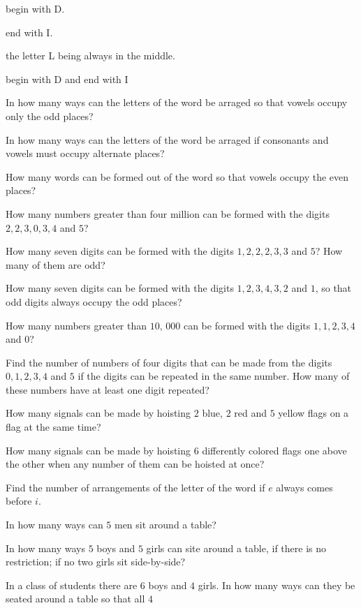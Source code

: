   \startitemize[i]
  \item begin with D.
  \item end with I.
  \item the letter L being always in the middle.
  \item begin with D and end with I
  \stopitemize
\item In how many ways can the letters of the word  be arraged so that vowels occupy only the odd places?
\item In how many ways can the letters of the word  be arraged if consonants and vowels must occupy alternate places?
\item How many words can be formed out of the word  so that vowels occupy the even places?
\item How many numbers greater than four million can be formed with the digits $2, 2, 3, 0, 3, 4$ and $5$?
\item How many seven digits can be formed with the digits $1, 2, 2, 2, 3, 3$ and $5$? How many of them are odd?
\item How many seven digits can be formed with the digits $1, 2, 3, 4, 3, 2$ and $1$, so that odd digits always occupy the odd
  places?
\item How many numbers greater than $10,\,000$ can be formed with the digits $1, 1, 2, 3, 4$ and $0$?
\item Find the number of numbers of four digits that can be made from the digits $0, 1, 2, 3, 4$ and $5$ if the digits can be
  repeated in the same number. How many of these numbers have at least one digit repeated?
\item How many signals can be made by hoisting $2$ blue, $2$ red and $5$ yellow flags on a flag at the same time?
\item How many signals can be made by hoisting $6$ differently colored flags one above the other when any number of them can be
  hoisted at once?
\item Find the number of arrangements of the letter of the word  if $e$ always comes before $i$.
\item In how many ways can $5$ men sit around a table?
\item In how many ways $5$ boys and $5$ girls can site around a table, if there is no restriction; if no two girls sit
  side-by-side?
\item In a class of students there are $6$ boys and $4$ girls. In how many ways can they be seated around a table so that all $4$
